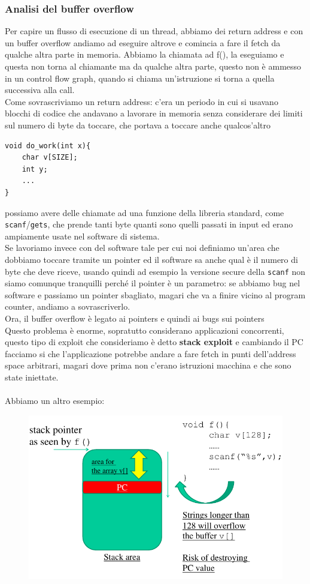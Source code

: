\documentclass[12pt, oneside]{extbook}
\begin{document}
\subsubsection{Analisi del buffer overflow}
Per capire un flusso di esecuzione di un thread, abbiamo dei return address e con un buffer overflow andiamo ad eseguire altrove e comincia a fare il fetch da qualche altra parte in memoria. Abbiamo la chiamata ad f(), la eseguiamo e questa non torna al chiamante ma da qualche altra parte, questo non è ammesso in un control flow graph, quando si chiama un'istruzione si torna a quella successiva alla call.\\Come sovrascriviamo un return address: c'era un periodo in cui si usavano blocchi di codice che andavano a lavorare in memoria senza considerare dei limiti sul numero di byte da toccare, che portava a toccare anche qualcos'altro 
\begin{lstlisting}
void do_work(int x){
	char v[SIZE];
	int y;
	...
}
\end{lstlisting}
possiamo avere delle chiamate ad una funzione della libreria standard, come \texttt{scanf}/\texttt{gets}, che prende tanti byte quanti sono quelli passati in input ed erano ampiamente usate nel software di sistema.\\Se lavoriamo invece con del software tale per cui noi definiamo un'area che dobbiamo toccare tramite un pointer ed il software sa anche qual è il numero di byte che deve riceve, usando quindi ad esempio la versione secure della \texttt{scanf} non siamo comunque tranquilli perché il pointer è un parametro: se abbiamo bug nel software e passiamo un pointer sbagliato, magari che va a finire vicino al program counter, andiamo a sovrascriverlo.\\Ora, il buffer overflow è legato ai pointers e quindi ai bugs sui pointers\\Questo problema è enorme, sopratutto considerano applicazioni concorrenti, questo tipo di exploit che consideriamo è detto \textbf{stack exploit} e cambiando il PC facciamo si che l'applicazione potrebbe andare a fare fetch in punti dell'address space arbitrari, magari dove prima non c'erano istruzioni macchina e che sono state iniettate.\\\\Abbiamo un altro esempio:
\begin{figure}[!h]
	\includegraphics[scale=0.5]{immagini/bo_example.png}
\end{figure}
\end{document}
